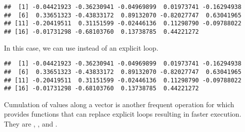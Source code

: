 \documentclass[krantz2]{krantz}\usepackage{knitr}%
\begin{document}
\begin{explainbox}
\begin{knitrout}\footnotesize
{}\color{fgcolor}\begin{kframe}
\begin{alltt}
\hlstd{(}\hlstd{)}
 \hlkwb{<-} \hlstd{(}\hlstd{)}
 \hlkwb{<-} \hlstd{(} \hlopt{-} \hlstd{)}
   \hlstd{(} 
   \hlkwb{<-} \hlstd{a.vector[i} \hlopt{+} \hlstd{]} \hlopt{-} 
  \hlstd{\}}
\end{alltt}
\begin{verbatim}
##  [1] -0.04421923 -0.36230941 -0.04969899  0.01973741 -0.16294938
##  [6]  0.33651323 -0.43833172  0.89132070 -0.82027747  0.63041965
## [11] -0.20419511  0.31151599 -0.02446136  0.11298790 -0.09788022
## [16] -0.01731298 -0.68103760  0.13738785  0.44221272
\end{verbatim}
\end{kframe}
\end{knitrout}

In this case, we can use  instead of an explicit loop.

\begin{knitrout}\footnotesize
{}\color{fgcolor}\begin{kframe}
\begin{alltt}
 \hlkwb{<-} 
\end{alltt}
\begin{verbatim}
##  [1] -0.04421923 -0.36230941 -0.04969899  0.01973741 -0.16294938
##  [6]  0.33651323 -0.43833172  0.89132070 -0.82027747  0.63041965
## [11] -0.20419511  0.31151599 -0.02446136  0.11298790 -0.09788022
## [16] -0.01731298 -0.68103760  0.13738785  0.44221272
\end{verbatim}
\end{kframe}
\end{knitrout}

Cumulation of values along a vector is another frequent operation for which \Rlang provides functions that can replace explicit  loops resulting in faster execution. They are , ,  and .

\end{explainbox}
\end{document}
